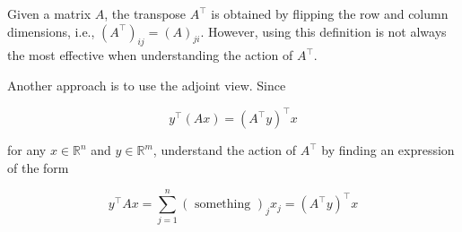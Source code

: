 \begin{frame}[allowframebreaks]

Given a matrix $A$, the transpose $A^{\top}$ is obtained by flipping the row and column dimensions, i.e., $\left(A^{\top}\right)_{i j}=(A)_{j i}$.
However, using this definition is not always the most effective when understanding the action of $A^{\top}$.

Another approach is to use the adjoint view. Since

$$
y^{\top}(A x)=\left(A^{\top} y\right)^{\top} x
$$

for any $x \in \mathbb{R}^{n}$ and $y \in \mathbb{R}^{m}$, understand the action of $A^{\top}$ by finding an expression of the form

$$
y^{\top} A x=\sum_{j=1}^{n}(\text { something })_{j} x_{j}=\left(A^{\top} y\right)^{\top} x
$$

\end{frame}

